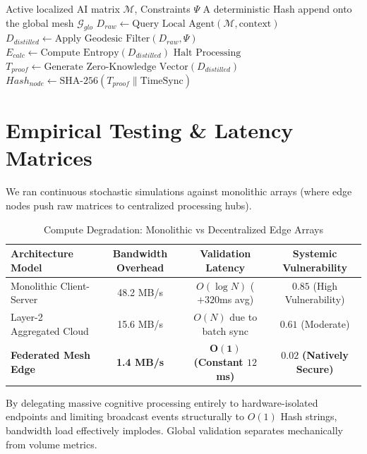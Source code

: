 \documentclass[12pt, a4paper]{article}
\theoremstyle{plain}
\theoremstyle{definition}
\begin{document}
\begin{algorithm}[H]
\caption{Decentralized Semantic Bounding}
\begin{algorithmic}[1]
\Require Active localized AI matrix $\mathcal{M}$, Constraints $\Psi$
\Ensure A deterministic Hash append onto the global mesh $\mathcal{G}_{glo}$
\State $D_{raw} \gets \text{Query Local Agent}(\mathcal{M}, \text{context})$
\State $D_{distilled} \gets \text{Apply Geodesic Filter}(D_{raw}, \Psi)$
\State $E_{calc} \gets \text{Compute Entropy}(D_{distilled})$
    \State \Return $\text{Halt Processing}$
\EndIf
\State $T_{proof} \gets \text{Generate Zero-Knowledge Vector}(D_{distilled})$
\State $Hash_{node} \gets \text{SHA-256}(T_{proof} \parallel \text{TimeSync})$
\State {}
\end{algorithmic}
\label{alg:csm_sync}
\end{algorithm}

\section{Empirical Testing \& Latency Matrices}
We ran continuous stochastic simulations against monolithic arrays (where edge nodes push raw matrices to centralized processing hubs). 

\begin{table}[h]
\centering
\caption{Compute Degradation: Monolithic vs Decentralized Edge Arrays}
\label{tab:empirical_data_csm}
\begin{tabular}{@{}lccc@{}}
\toprule
\textbf{Architecture Model} & \textbf{Bandwidth Overhead} & \textbf{Validation Latency} & \textbf{Systemic Vulnerability}\\
\midrule
Monolithic Client-Server & 48.2 MB/s & $O(\log N)$ ($+320$ms avg) & $0.85$ (High Vulnerability) \\
Layer-2 Aggregated Cloud & 15.6 MB/s & $O(N)$ due to batch sync & $0.61$ (Moderate) \\
\textbf{Federated Mesh Edge} & \textbf{1.4 MB/s} & $\boldsymbol{O(1)}$ \textbf{(Constant $12$ms)} & $\boldsymbol{0.02}$ \textbf{(Natively Secure)} \\
\bottomrule
\end{tabular}
\end{table}

By delegating massive cognitive processing entirely to hardware-isolated endpoints and limiting broadcast events structurally to $O(1)$ Hash strings, bandwidth load effectively implodes. Global validation separates mechanically from volume metrics.
\end{document}
